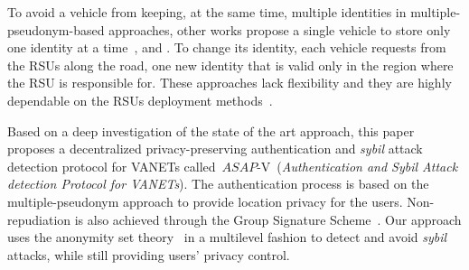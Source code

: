 \documentclass[preprint,12pt]{elsarticle}
\newcommand{\protocolname}{$ASAP$-V}
\begin{document}
To avoid a vehicle from keeping, at the same time, multiple identities in multiple-pseudonym-based approaches, other works propose a single vehicle to store only one identity at a time~\cite{keys-distro4}, \cite{keys-distro7} and \cite{profile-generation1}. To change its identity, each vehicle requests from the RSUs along the road, one new identity that is valid only in the region where the RSU is responsible for. These approaches lack flexibility and they are highly dependable on the RSUs deployment methods~\cite{rsu-placement1}.


Based on a deep investigation of the state of the art approach, this paper proposes a decentralized privacy-preserving authentication and \textit{sybil} attack detection protocol for VANETs called~\protocolname~(\textit{Authentication and Sybil Attack detection Protocol for VANETs}). The authentication process is based on the multiple-pseudonym approach to provide location privacy for the users. Non-repudiation is also achieved through the Group Signature Scheme~\cite{group-sign}. Our approach uses the anonymity set theory~\cite{k-anonymity} in a multilevel fashion to detect and avoid \textit{sybil} attacks, while still providing users' privacy control.

\end{document}
